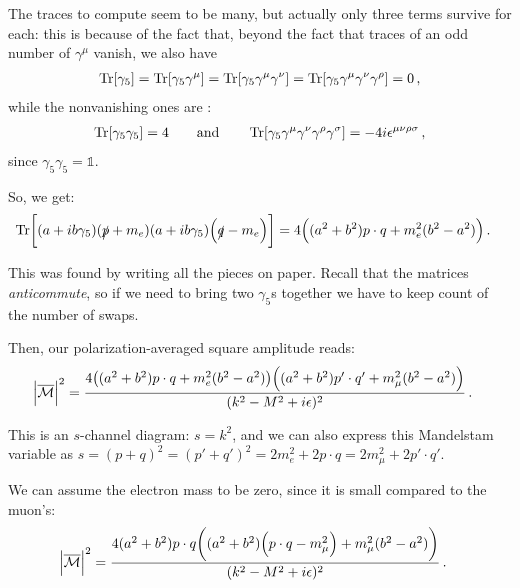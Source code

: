 \documentclass[main.tex]{subfiles}
\begin{document}
The traces to compute seem to be many, but actually only three terms survive for each: this is because of the fact that, beyond the fact that traces of an odd number of \(\gamma^{\mu }\) vanish, we also have 
%
\begin{align}
\Tr[\gamma_5 ] 
= \Tr[\gamma_5 \gamma^{\mu }]
= \Tr[\gamma_5 \gamma^{\mu } \gamma^{\nu }]
= \Tr[\gamma_5 \gamma^{\mu } \gamma^{\nu } \gamma^{\rho }]
= 0
\,,
\end{align}
%
while the nonvanishing ones are \cite[section 6.3]{kumerickiFeynmanDiagramsBeginners2016}: 
%
\begin{align}
\Tr[\gamma_5 \gamma_5 ] = 4 \qquad \text{and} \qquad
\Tr[\gamma_5 \gamma^{\mu } \gamma^{\nu } \gamma^{\rho } \gamma^{\sigma }] = -4i \epsilon^{\mu \nu \rho \sigma }
\,,
\end{align}
%
since \(\gamma_{5} \gamma_5  = \mathbb{1} \). 

So, we get: 
%
\begin{align}
\Tr[ (a + i b \gamma_5 ) (\slashed{p} + m_e) \qty(a + i b \gamma_5 ) \qty(\slashed{q} - m_e)] &= 4 \qty( (a^2 + b^2) p \cdot q +  m_e^2 ( b^2 -a ^2))
\,.
\end{align}

This was found by writing all the pieces on paper. Recall that the matrices \emph{anticommute}, so if we need to bring two \(\gamma_5\)s together we have to keep count of the number of swaps. 

Then, our polarization-averaged square amplitude reads: 
%
\begin{align}
\abs{\mathcal{\overline{M}}}^2
&=
\frac{4 \qty( (a^2 + b^2) p \cdot q +  m_e^2 ( b^2 -a ^2)) \qty( (a^2 + b^2) p' \cdot q' +  m_\mu^2 ( b^2 -a ^2))}{ (k^2- M^2 + i \epsilon)^2 }
\,.
\end{align}

This is an \(s\)-channel diagram: \(s = k^2\), and we can also express this Mandelstam variable as \(s = (p + q)^2 = (p'+ q')^2 = 2 m_e^2 + 2p \cdot q  = 2 m_\mu^2 + 2 p' \cdot q'\).

We can assume the electron mass to be zero, since it is small compared to the muon's: 
%
\begin{align}
\abs{\mathcal{\overline{M}}}^2
&=
\frac{4 (a^2 + b^2) p \cdot q \qty( (a^2 + b^2) \qty( p \cdot q - m_\mu^2) +  m_\mu^2 ( b^2 -a ^2))}{ (k^2- M^2 + i \epsilon)^2 }
\,.
\end{align}
\end{document}

